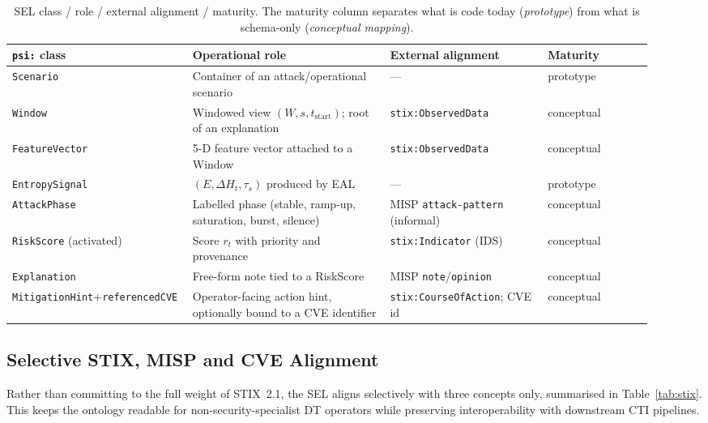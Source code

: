 \documentclass[futureinternet,article,submit,pdftex,moreauthors]{Definitions/mdpi}
\newcommand{\EntropyDeviation}{\ensuremath{\Delta H}}
\newcommand{\taus}{\ensuremath{\tau_{s}}}
\begin{document}
\begin{table}[t]
\centering
\caption{SEL class / role / external alignment / maturity. The maturity
column separates what is code today (\emph{prototype}) from what is
schema-only (\emph{conceptual mapping}).}
\label{tab:sel-maturity}
\small
\begin{tabular}{@{}p{0.22\linewidth}p{0.30\linewidth}p{0.24\linewidth}p{0.16\linewidth}@{}}
\toprule
\textbf{\texttt{psi:} class} & \textbf{Operational role}
  & \textbf{External alignment} & \textbf{Maturity} \\
\midrule
\texttt{Scenario}        & Container of an attack/operational scenario
  & ---                                  & prototype \\
\texttt{Window}          & Windowed view $(W, s, t_{\mathrm{start}})$;
                          root of an explanation
  & \texttt{stix:ObservedData}           & conceptual \\
\texttt{FeatureVector}   & 5-D feature vector attached to a Window
  & \texttt{stix:ObservedData}           & conceptual \\
\texttt{EntropySignal}   & $(E, \EntropyDeviation_t, \taus)$ produced by EAL
  & ---                                  & prototype \\
\texttt{AttackPhase}     & Labelled phase (stable, ramp-up, saturation,
                          burst, silence)
  & MISP \texttt{attack-pattern} (informal) & conceptual \\
\texttt{RiskScore} (activated) & Score $r_t$ with priority and
                          provenance
  & \texttt{stix:Indicator} (IDS)        & conceptual \\
\texttt{Explanation}     & Free-form note tied to a RiskScore
  & MISP \texttt{note}/\texttt{opinion}  & conceptual \\
\texttt{MitigationHint}+\texttt{referencedCVE}
                         & Operator-facing action hint, optionally
                          bound to a CVE identifier
  & \texttt{stix:CourseOfAction}; CVE id & conceptual \\
\bottomrule
\end{tabular}
\end{table}

\subsection{Selective STIX, MISP and CVE Alignment}

Rather than committing to the full weight of STIX~2.1, the SEL aligns
selectively with three concepts only, summarised in Table~\ref{tab:stix}.
This keeps the ontology readable for non-security-specialist DT
operators while preserving interoperability with downstream CTI
pipelines.
\end{document}
